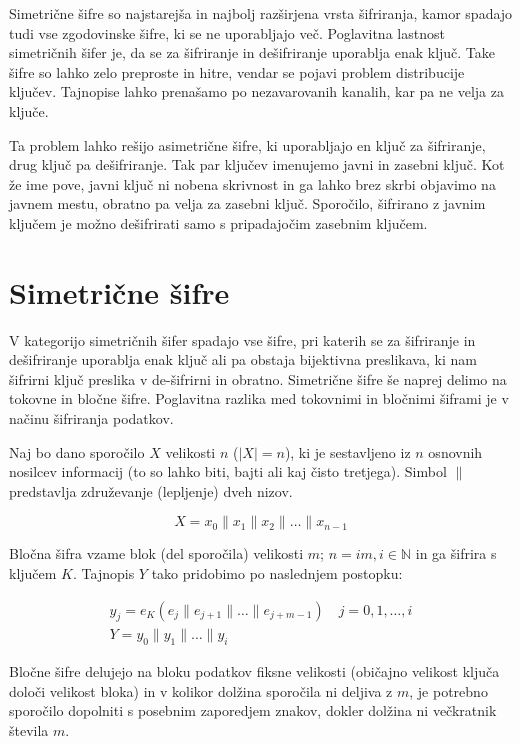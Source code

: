 \documentclass[12pt,a4paper,openany]{book}
\begin{document}
Simetrične šifre so najstarejša in najbolj razširjena vrsta šifriranja, kamor spadajo tudi vse zgodovinske šifre, ki se ne uporabljajo več. Poglavitna lastnost simetričnih šifer je, da se za šifriranje in dešifriranje uporablja enak ključ. Take šifre so lahko zelo preproste in hitre, vendar se pojavi problem distribucije ključev. Tajnopise lahko prenašamo po nezavarovanih kanalih, kar pa ne velja za ključe.

Ta problem lahko rešijo asimetrične šifre, ki uporabljajo en ključ za šifriranje, drug ključ pa dešifriranje. Tak par ključev imenujemo javni in zasebni ključ. Kot že ime pove, javni ključ ni nobena skrivnost in ga lahko brez skrbi objavimo na javnem mestu, obratno pa velja za zasebni ključ. Sporočilo, šifrirano z javnim ključem je možno dešifrirati samo s pripadajočim zasebnim ključem.

\section{Simetrične šifre}

V kategorijo simetričnih šifer spadajo vse šifre, pri katerih se za šifriranje in dešifriranje uporablja enak ključ ali pa obstaja bijektivna preslikava, ki nam šifrirni ključ preslika v de-šifrirni in obratno. Simetrične šifre še naprej delimo na tokovne in bločne šifre. Poglavitna razlika med tokovnimi in bločnimi šiframi je v načinu šifriranja podatkov.

Naj bo dano sporočilo $X$ velikosti $n$ ($|X|=n$), ki je sestavljeno iz $n$ osnovnih nosilcev informacij (to so lahko biti, bajti ali kaj čisto tretjega). Simbol $\|$ predstavlja združevanje (lepljenje) dveh nizov.

$$
X=x_0 \| x_1 \| x_2 \| \dotsc \| x_{n-1}
$$

Bločna šifra vzame blok (del sporočila) velikosti $m$; $n=im, i\in\mathbb{N} $ in ga šifrira s ključem $K$. Tajnopis $Y$ tako pridobimo po naslednjem postopku:

\begin{gather*}
	y_j = e_K(e_{j} \| e_{j+1} \| \dotsc \| e_{j+m-1})  \quad j=0,1,\dotsc,i\\
	Y = y_0 \| y_1 \| \dotsc \| y_i
\end{gather*}

Bločne šifre delujejo na bloku podatkov fiksne velikosti (običajno velikost ključa določi velikost bloka) in v kolikor dolžina sporočila ni deljiva z $m$, je potrebno sporočilo dopolniti s posebnim zaporedjem znakov, dokler dolžina ni večkratnik števila $m$.
\end{document}
